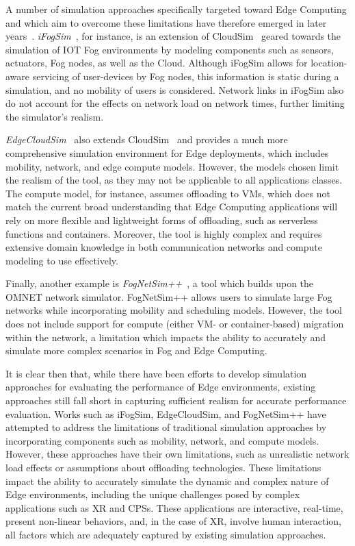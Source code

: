 A number of simulation approaches specifically targeted toward Edge Computing and which aim to overcome these limitations have therefore emerged in later years~\cite{svorobej2019simulating}.
\emph{iFogSim}~\cite{gupta2017ifogsim}, for instance, is an extension of CloudSim~\cite{calheiros2011cloudsim} geared towards the simulation of \gls{IOT} Fog environments by modeling components such as sensors, actuators, Fog nodes, as well as the Cloud.
Although iFogSim allows for location-aware servicing of user-devices by Fog nodes, this information is static during a simulation, and no mobility of users is considered.
Network links in iFogSim also do not account for the effects on network load on network times, further limiting the simulator's realism.\@

\emph{EdgeCloudSim}~\cite{sonmez2018edgecloudsim} also extends CloudSim~\cite{calheiros2011cloudsim} and provides a much more comprehensive simulation environment for Edge deployments, which includes mobility, network, and edge compute models.
However, the models chosen limit the realism of the tool, as they may not be applicable to all applications classes.
The compute model, for instance, assumes offloading to \glspl{VM}, which does not match the current broad understanding that Edge Computing applications will rely on more flexible and lightweight forms of offloading, such as serverless functions and containers.
Moreover, the tool is highly complex and requires extensive domain knowledge in both communication networks and compute modeling to use effectively.

Finally, another example is \emph{FogNetSim++}~\cite{qayyum2018fognetsimpp}, a tool which builds upon the \acs{OMNET} network simulator.
FogNetSim++ allows users to simulate large Fog networks while incorporating mobility and scheduling models.
However, the tool does not include support for compute (either \gls{VM}- or container-based) migration within the network, a limitation which impacts the ability to accurately and simulate more complex scenarios in Fog and Edge Computing.

It is clear then that, while there have been efforts to develop simulation approaches for evaluating the performance of Edge environments, existing approaches still fall short in capturing sufficient realism for accurate performance evaluation.
Works such as iFogSim, EdgeCloudSim, and FogNetSim++ have attempted to address the limitations of traditional simulation approaches by incorporating components such as mobility, network, and compute models.
However, these approaches have their own limitations, such as unrealistic network load effects or assumptions about offloading technologies.
These limitations impact the ability to accurately simulate the dynamic and complex nature of Edge environments, including the unique challenges posed by complex applications such as \gls{XR} and \glspl{CPS}.
These applications are interactive, real-time, present non-linear behaviors, and, in the case of \gls{XR}, involve human interaction, all factors which are adequately captured by existing simulation approaches.

